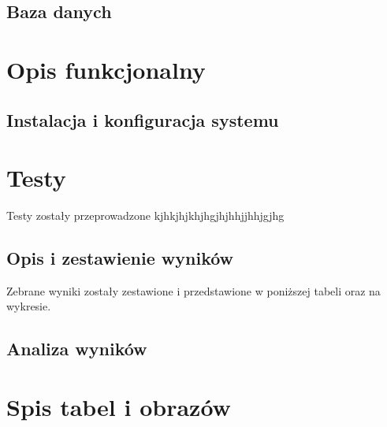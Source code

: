 \documentclass[a4paper, 11pt]{report}
\begin{document}
	\section{Baza danych}


\chapter{Opis funkcjonalny}

	\section{Instalacja i konfiguracja systemu}
	

\chapter{Testy}

	Testy zostały przeprowadzone kjhkjhjkhjhgjhjhhjjhhjgjhg
	
	\section{Opis i zestawienie wyników}
	
	Zebrane wyniki zostały zestawione i przedstawione w poniższej tabeli oraz na wykresie.
	

%	
	
	\section{Analiza wyników}	

\chapter{Spis tabel i obrazów}


\begingroup
\let\clearpage\relax
\listoffigures
\listoftables
\endgroup
\end{document}
